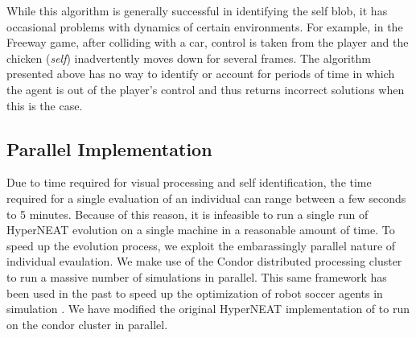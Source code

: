 \documentclass{acm_proc_article-sp}
\begin{document}
While this algorithm is generally successful in identifying the self blob, it has occasional problems with dynamics of certain environments. For example, in the Freeway game, after colliding with a car, control is taken from the player and the chicken (\textit{self}) inadvertently moves down for several frames. The algorithm presented above has no way to identify or account for periods of time in which the agent is out of the player's control and thus returns incorrect solutions when this is the case. 

\subsection{Parallel Implementation}
\label{sec:condor}
Due to time required for visual processing and self identification, the time required for a single evaluation of an individual can range between a few seconds to 5 minutes. Because of this reason, it is infeasible to run a single run of HyperNEAT evolution on a single machine in a reasonable amount of time. To speed up the evolution process, we exploit the embarassingly parallel nature of individual evaulation. We make use of the Condor distributed processing cluster \cite{condor} to run a massive number of simulations in parallel. This same framework has been used in the past to speed up the optimization of robot soccer agents in simulation \cite{urieli}. We have modified the original HyperNEAT implementation of \cite{original-authors} to run on the condor cluster in parallel.

\end{document}
